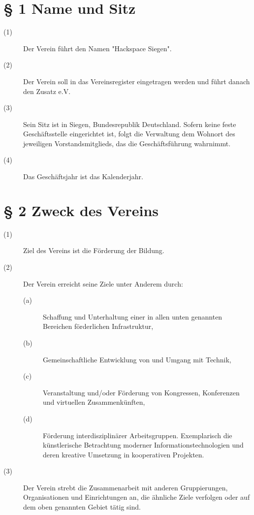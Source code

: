 \documentclass[a4paper,12pt]{scrartcl}
\begin{document}


\renewcommand{\sectionmark}[1]{\markright{#1}}
\renewcommand{\subsectionmark}[1]{}
\renewcommand{\subsubsectionmark}[1]{}
\rhead{\today}

\onehalfspacing
\renewcommand{\thesection}{\arabic{section}}
\renewcommand{\thesection}{\arabic{section}}
\setcounter{section}{0}
\setcounter{page}{1}


\section*{\S{} 1 Name und Sitz}
\begin{description} 

\item[(1)] Der Verein führt den Namen "Hackspace Siegen".
\item[(2)] Der Verein soll in das Vereinsregister eingetragen werden und führt danach den Zusatz e.V.
\item[(3)] Sein Sitz ist in Siegen, Bundesrepublik Deutschland. Sofern keine feste Geschäftsstelle eingerichtet ist, folgt die Verwaltung dem Wohnort des jeweiligen Vorstandsmitglieds, das die Geschäftsführung wahrnimmt. 
\item[(4)] Das Geschäftsjahr ist das Kalenderjahr.

\end{description}



\section*{\S{} 2 Zweck des Vereins}
\begin{description} 

\item[(1)] Ziel des Vereins ist die Förderung der Bildung.
\item[(2)] Der Verein erreicht seine Ziele unter Anderem durch:
\begin{description}
 \item[(a)] Schaffung und Unterhaltung einer in allen unten genannten Bereichen förderlichen Infrastruktur,
 \item[(b)] Gemeinschaftliche Entwicklung von und Umgang mit Technik,
 \item[(c)] Veranstaltung und/oder Förderung von Kongressen, Konferenzen und virtuellen Zusammenkünften,
 \item[(d)] Förderung interdisziplinärer Arbeitsgruppen. Exemplarisch die künstlerische Betrachtung moderner Informationstechnologien und deren kreative Umsetzung in kooperativen Projekten.
\end{description}
\item[(3)] Der Verein strebt die Zusammenarbeit mit anderen Gruppierungen, Organisationen und Einrichtungen an, die ähnliche Ziele verfolgen oder auf dem oben genannten Gebiet tätig sind.
 
\end{description}
\end{document}
